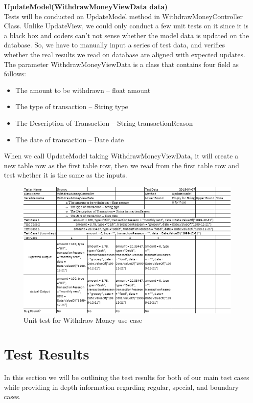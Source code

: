 \documentclass[12pt]{article}
\begin{document}
{\bf UpdateModel(WithdrawMoneyViewData data)}\\
Tests will be conducted on UpdateModel method in WithdrawMoneyController Class. Unlike UpdateView, we could only conduct a few unit tests on it since it is a black box and coders can’t not sense whether the model data is updated on the database. So, we have to manually input a series of test data, and verifies whether the real results we read on database are aligned with expected updates. The parameter WithdrawMoneyViewData is a class that contains four field as follows:
\begin{itemize}
  \item The amount to be withdrawn – float amount
  \item The type of transaction – String type
  \item The Description of Transaction – String transactionReason
  \item The date of transaction – Date date
\end{itemize}
When we call UpdateModel taking WithdrawMoneyViewData, it will create a new table row as the first table row, then we read from the first table row and test whether it is the same as the inputs.

\begin{figure}[h!]
  \centering
  \includegraphics[]{unit_test_withdraw.png}
  \caption{Unit test for Withdraw Money use case}
\end{figure}

\section{Test Results}

In this section we will be outlining the test results for both of our main test cases while providing in depth information regarding regular, special, and boundary cases. 
\end{document}
